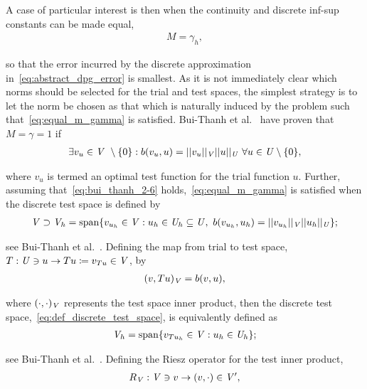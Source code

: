 A case of particular interest is then when the continuity and discrete inf-sup constants can be made equal,
\begin{align} \label{eq:equal_m_gamma}
M = \gamma_h,
\end{align}

so that the error incurred by the discrete approximation in~\eqref{eq:abstract_dpg_error} is smallest. As it is not
immediately clear which norms should be selected for the trial and test spaces, the simplest strategy is to let the norm
be chosen as that which is naturally induced by the problem such that~\eqref{eq:equal_m_gamma} is satisfied. Bui-Thanh
et al.~\cite[Theorem ]{BuiThanh2013} have proven that $M = \gamma = 1$ if
\begin{align} \label{eq:bui_thanh_2-6}
\exists v_u \in \mathit{{{V}}}\ \setminus \{0\} :
b(v_u,u) = ||v_u||_{\mathit{{{V}}}} ||u||_{\mathit{{{U}}}}\ \forall u \in \mathit{{{U}}} \setminus \{0\},
\end{align}

where $v_u$ is termed an optimal test function for the trial function $u$. Further, assuming
that~\eqref{eq:bui_thanh_2-6} holds,~\eqref{eq:equal_m_gamma} is satisfied when the discrete test space is defined by
\begin{align} \label{eq:def_discrete_test_space}
\mathit{{{V}}} \supset \mathit{{{V}}}_h 
= {\text{span} \{ v_{u_h} \in \mathit{{{V}}} : u_h \in \mathit{{{U}}}_h \subseteq \mathit{{{U}}},\ b(v_{u_h},u_h) }
= ||v_{u_h}||_{\mathit{{{V}}}} ||u_h||_{\mathit{{{U}}}} \};
\end{align}

see Bui-Thanh et al.~\cite[Lemma ]{BuiThanh2013}. Defining the map from trial to test space, $T :
\mathit{{{U}}} \ni u \rightarrow Tu \coloneqq v_{Tu} \in \mathit{{{V}}} $, by
\begin{align}
(v,Tu)_{\mathit{{{V}}}} = b(v,u),
\end{align}

where $(\cdot,\cdot)_{\mathit{{{V}}}}$ represents the test space inner product, then the discrete test
space,~\eqref{eq:def_discrete_test_space}, is equivalently defined as
\begin{align} \label{eq:def_discrete_test_space_alt}
\mathit{{{V}}}_h = {\text{span} \{ v_{T u_h} \in \mathit{{{V}}} : u_h \in \mathit{{{U}}}_h \} };
\end{align}

see Bui-Thanh et al.~\cite[Theorem ]{BuiThanh2013}. Defining the Riesz operator for the test inner
product,
\begin{align}
R_{\mathit{{{V}}}} : \mathit{{{V}}} \ni v \rightarrow (v,\cdot) \in \mathit{{{V}}}',
\end{align}


